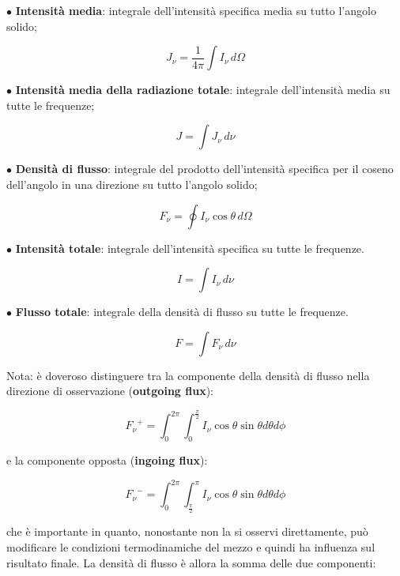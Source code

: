 \vspace{0.3cm}$\bullet$ \textbf{Intensità media}: integrale dell'intensità specifica media su tutto l'angolo solido;

\begin{equation}
    {J_\nu} = \frac{1}{4\pi} \int {I_\nu} \, d\Omega
    \label{eq:intensita_media}
\end{equation}

$\bullet$ \textbf{Intensità media della radiazione totale}: integrale dell'intensità media su tutte le frequenze;

\begin{equation}
    J = \int {J_\nu} \, d\nu
\end{equation}

$\bullet$ \textbf{Densità di flusso}: integrale del prodotto dell'intensità specifica per il coseno dell'angolo in una direzione su tutto l'angolo solido;

\begin{equation}
    {F_\nu} = \oint {I_\nu} \cos{\theta} \, d\Omega
\end{equation}

$\bullet$ \textbf{Intensità totale}: integrale dell'intensità specifica su tutte le frequenze.

\begin{equation}
    I=\int {I_\nu} \, d\nu
\end{equation}

$\bullet$ \textbf{Flusso totale}: integrale della densità di flusso su tutte le frequenze.

\begin{equation}
    F=\int {F_\nu} \, d\nu
\end{equation}

Nota: è doveroso distinguere tra la componente della densità di flusso nella direzione di osservazione (\textbf{outgoing flux}):

\begin{equation*}
    {{F_\nu}^{+}} = \int_{0}^{2\pi} \int_{0}^{\frac{\pi}{2}} {I_\nu} \cos{\theta} \sin{\theta} d\theta d\phi
\end{equation*}

e la componente opposta (\textbf{ingoing flux}):

\begin{equation*}
    {{F_\nu}^{-}}=\int_{0}^{2\pi} \int_{\frac{\pi}{2}}^{\pi} {I_\nu} \cos{\theta} \sin{\theta} d\theta d\phi
\end{equation*}

che è importante in quanto, nonostante non la si osservi direttamente, può modificare le condizioni termodinamiche del mezzo e quindi ha influenza sul risultato finale.
La densità di flusso è allora la somma delle due componenti:

